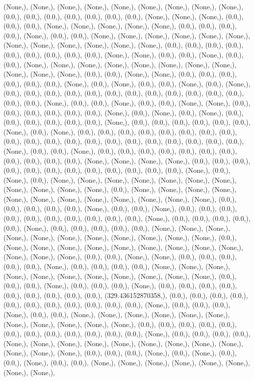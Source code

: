 \documentclass{article}
\begin{document}
(None,), (None,), (None,), (None,), (None,), (None,), (None,), (None,), (None,), (0.0,), (0.0,), (0.0,), (0.0,), (0.0,), (0.0,), (0.0,), (None,), (None,), (None,), (0.0,), (0.0,), (0.0,), (None,), (None,), (None,), (None,), (None,), (0.0,), (0.0,), (0.0,), (0.0,), (None,), (0.0,), (0.0,), (None,), (None,), (None,), (None,), (None,), (None,), (None,), (None,), (None,), (None,), (None,), (None,), (0.0,), (0.0,), (0.0,), (0.0,), (0.0,), (0.0,), (0.0,), (0.0,), (0.0,), (None,), (None,), (0.0,), (0.0,), (None,), (0.0,), (0.0,), (None,), (None,), (None,), (None,), (None,), (None,), (None,), (None,), (None,), (None,), (None,), (0.0,), (0.0,), (None,), (None,), (0.0,), (0.0,), (0.0,), (0.0,), (0.0,), (0.0,), (None,), (0.0,), (None,), (0.0,), (0.0,), (None,), (0.0,), (None,), (0.0,), (0.0,), (0.0,), (0.0,), (0.0,), (0.0,), (0.0,), (0.0,), (0.0,), (0.0,), (0.0,), (0.0,), (0.0,), (0.0,), (None,), (0.0,), (0.0,), (None,), (0.0,), (0.0,), (None,), (None,), (0.0,), (0.0,), (0.0,), (0.0,), (0.0,), (0.0,), (None,), (0.0,), (None,), (0.0,), (None,), (0.0,), (0.0,), (0.0,), (0.0,), (0.0,), (0.0,), (None,), (0.0,), (0.0,), (0.0,), (0.0,), (0.0,), (0.0,), (None,), (0.0,), (None,), (0.0,), (0.0,), (0.0,), (0.0,), (0.0,), (0.0,), (0.0,), (0.0,), (0.0,), (0.0,), (0.0,), (0.0,), (0.0,), (0.0,), (0.0,), (0.0,), (0.0,), (0.0,), (0.0,), (0.0,), (None,), (0.0,), (0.0,), (None,), (0.0,), (0.0,), (0.0,), (0.0,), (0.0,), (0.0,), (0.0,), (0.0,), (0.0,), (0.0,), (0.0,), (None,), (None,), (None,), (None,), (0.0,), (0.0,), (0.0,), (0.0,), (0.0,), (0.0,), (0.0,), (0.0,), (0.0,), (0.0,), (0.0,), (0.0,), (None,), (0.0,), (None,), (0.0,), (None,), (None,), (None,), (None,), (None,), (None,), (None,), (None,), (None,), (None,), (None,), (0.0,), (None,), (None,), (None,), (None,), (None,), (None,), (None,), (None,), (None,), (None,), (None,), (None,), (0.0,), (0.0,), (0.0,), (0.0,), (0.0,), (None,), (0.0,), (0.0,), (None,), (0.0,), (0.0,), (0.0,), (0.0,), (0.0,), (0.0,), (0.0,), (0.0,), (0.0,), (0.0,), (None,), (0.0,), (0.0,), (0.0,), (0.0,), (0.0,), (None,), (0.0,), (0.0,), (0.0,), (0.0,), (0.0,), (None,), (None,), (None,), (None,), (None,), (None,), (None,), (None,), (None,), (None,), (None,), (0.0,), (None,), (None,), (None,), (None,), (None,), (None,), (None,), (None,), (None,), (None,), (None,), (None,), (0.0,), (0.0,), (None,), (None,), (0.0,), (0.0,), (0.0,), (0.0,), (0.0,), (None,), (0.0,), (0.0,), (0.0,), (0.0,), (None,), (None,), (None,), (None,), (None,), (None,), (None,), (None,), (None,), (None,), (None,), (0.0,), (0.0,), (0.0,), (None,), (0.0,), (0.0,), (0.0,), (None,), (0.0,), (0.0,), (0.0,), (0.0,), (0.0,), (0.0,), (0.0,), (0.0,), (0.0,), (329.436152870358,), (0.0,), (0.0,), (0.0,), (0.0,), (0.0,), (0.0,), (0.0,), (0.0,), (0.0,), (0.0,), (0.0,), (None,), (0.0,), (0.0,), (0.0,), (None,), (0.0,), (0.0,), (None,), (None,), (None,), (None,), (None,), (None,), (None,), (None,), (None,), (None,), (None,), (0.0,), (0.0,), (0.0,), (0.0,), (0.0,), (0.0,), (0.0,), (0.0,), (0.0,), (0.0,), (0.0,), (0.0,), (None,), (0.0,), (0.0,), (0.0,), (0.0,), (None,), (None,), (None,), (None,), (None,), (None,), (None,), (None,), (None,), (None,), (None,), (None,), (0.0,), (0.0,), (0.0,), (None,), (0.0,), (None,), (0.0,), (0.0,), (None,), (0.0,), (0.0,), (None,), (None,), (None,), (None,), (None,), (None,), (None,), (None,), 
\end{document}
